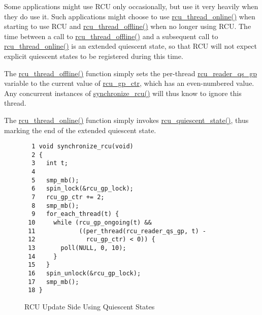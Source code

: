  \QuickQuizEnd

Some applications might use RCU only occasionally, but use it very heavily
when they do use it.
Such applications might choose to use \url{rcu_thread_online()} when
starting to use RCU and \url{rcu_thread_offline()} when no longer
using RCU.
The time between a call to \url{rcu_thread_offline()} and a subsequent
call to \url{rcu_thread_online()} is an extended quiescent state,
so that RCU will not expect explicit quiescent states to be registered
during this time.

The \url{rcu_thread_offline()} function simply sets the
per-thread \url{rcu_reader_qs_gp} variable to the current value of
\url{rcu_gp_ctr}, which has an even-numbered value.
Any concurrent instances of \url{synchronize_rcu()} will thus know to
ignore this thread.

 \QuickQuizEnd

The \url{rcu_thread_online()} function simply invokes
\url{rcu_quiescent_state()}, thus marking the end of the extended
quiescent state.

\begin{figure}[tbp]
{ \scriptsize
\begin{verbatim}
  1 void synchronize_rcu(void)
  2 {
  3   int t;
  4 
  5   smp_mb();
  6   spin_lock(&rcu_gp_lock);
  7   rcu_gp_ctr += 2;
  8   smp_mb();
  9   for_each_thread(t) {
 10     while (rcu_gp_ongoing(t) &&
 11            ((per_thread(rcu_reader_qs_gp, t) -
 12              rcu_gp_ctr) < 0)) {
 13       poll(NULL, 0, 10);
 14     }
 15   }
 16   spin_unlock(&rcu_gp_lock);
 17   smp_mb();
 18 }
\end{verbatim}
}
\caption{RCU Update Side Using Quiescent States}
\label{fig:defer:RCU Update Side Using Quiescent States}
\end{figure}

